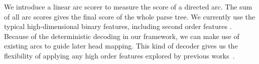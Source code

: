 
We introduce a linear arc scorer to measure the score of a directed arc.
The sum of all arc scores gives the final score of the whole parse tree.
We currently use the typical high-dimensional binary features,
including second order features \cite{mcdonald2006online}.
Because of the deterministic decoding in our framework,
we can make use of existing arcs to guide later head mapping.
This kind of decoder gives us the flexibility of applying any
high order features explored by previous
works~\cite{carreras2007experiments,koo2010efficient,ma2012fourth}.

